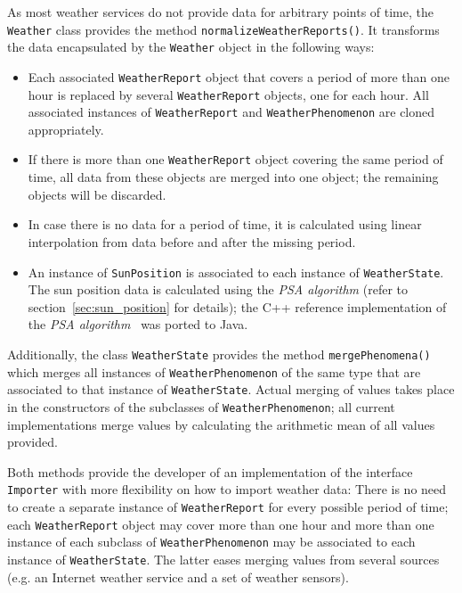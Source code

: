 As most weather services do not provide data for arbitrary points of time, the \texttt{Weather} class provides the method \texttt{normalizeWeatherReports()}. It transforms the data encapsulated by the \texttt{Weather} object in the following ways:
\begin{itemize}
  \item Each associated \texttt{WeatherReport} object that covers a period of more than one hour is replaced by several \texttt{WeatherReport} objects, one for each hour. All associated instances of \texttt{WeatherReport} and \texttt{WeatherPhenomenon} are cloned appropriately.
  
  \item If there is more than one \texttt{WeatherReport} object covering the same period of time, all data from these objects are merged into one object; the remaining objects will be discarded.
  
  \item In case there is no data for a period of time, it is calculated using linear interpolation from data before and after the missing period\cite{maths}.
  
  \item An instance of \texttt{SunPosition} is associated to each instance of \texttt{WeatherState}. The sun position data is calculated using the \emph{PSA algorithm}\cite{PSA_algorithm} (refer to section~\ref{sec:sun_position} for details); the C++ reference implementation of the \emph{PSA algorithm}~\cite{psa_online} was ported to Java.
\end{itemize}

Additionally, the class \texttt{WeatherState} provides the method \texttt{mergePhenomena()} which merges all instances of \texttt{WeatherPhenomenon} of the same type that are associated to that instance of \texttt{WeatherState}. Actual merging of values takes place in the constructors of the subclasses of \texttt{WeatherPhenomenon}; all current implementations merge values by calculating the arithmetic mean of all values provided\cite{maths}.

Both methods provide the developer of an implementation of the interface \texttt{Importer} with more flexibility on how to import weather data: There is no need to create a separate instance of \texttt{WeatherReport} for every possible period of time; each \texttt{WeatherReport} object may cover more than one hour and more than one instance of each subclass of \texttt{WeatherPhenomenon} may be associated to each instance of \texttt{WeatherState}. The latter eases merging values from several sources (e.g. an Internet weather service and a set of weather sensors).

